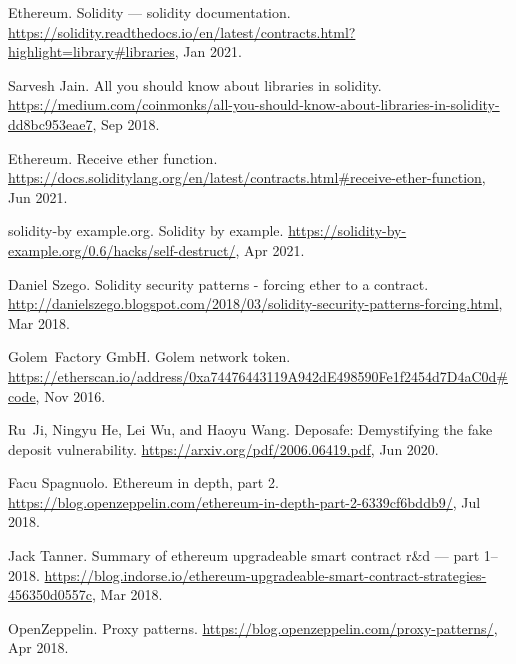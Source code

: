 \begin{thebibliography}{10}
Ethereum.
\newblock Solidity --- solidity documentation.
\newblock
  \url{https://solidity.readthedocs.io/en/latest/contracts.html?highlight=library\#libraries},
  Jan 2021.

Sarvesh Jain.
\newblock All you should know about libraries in solidity.
\newblock
  \url{https://medium.com/coinmonks/all-you-should-know-about-libraries-in-solidity-dd8bc953eae7},
  Sep 2018.

Ethereum.
\newblock Receive ether function.
\newblock
  \url{https://docs.soliditylang.org/en/latest/contracts.html#receive-ether-function},
  Jun 2021.

solidity-by example.org.
\newblock Solidity by example.
\newblock \url{https://solidity-by-example.org/0.6/hacks/self-destruct/}, Apr
  2021.

Daniel Szego.
\newblock Solidity security patterns - forcing ether to a contract.
\newblock
  \url{http://danielszego.blogspot.com/2018/03/solidity-security-patterns-forcing.html},
  Mar 2018.

Golem~Factory GmbH.
\newblock Golem network token.
\newblock
  \url{https://etherscan.io/address/0xa74476443119A942dE498590Fe1f2454d7D4aC0d#code},
  Nov 2016.

Ru~Ji, Ningyu He, Lei Wu, and Haoyu Wang.
\newblock Deposafe: Demystifying the fake deposit vulnerability.
\newblock \url{https://arxiv.org/pdf/2006.06419.pdf}, Jun 2020.

Facu Spagnuolo.
\newblock Ethereum in depth, part 2.
\newblock
  \url{https://blog.openzeppelin.com/ethereum-in-depth-part-2-6339cf6bddb9/},
  Jul 2018.

Jack Tanner.
\newblock Summary of ethereum upgradeable smart contract r\&d --- part 1--2018.
\newblock
  \url{https://blog.indorse.io/ethereum-upgradeable-smart-contract-strategies-456350d0557c},
  Mar 2018.

OpenZeppelin.
\newblock Proxy patterns.
\newblock \url{https://blog.openzeppelin.com/proxy-patterns/}, Apr 2018.

\end{thebibliography}
